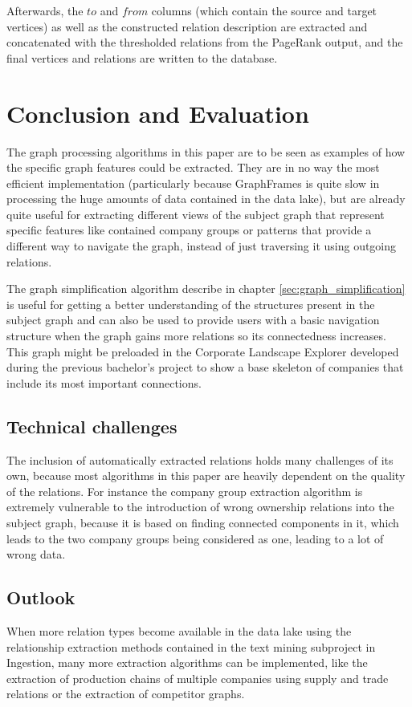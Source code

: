 \documentclass[
        a4paper,     %
        titlepage,   %
        oneside,     %
        parskip      %
]{scrartcl}          %
\begin{document}
  Afterwards, the $to$ and $from$ columns (which contain the source and target vertices)
  as well as the constructed relation description are extracted and concatenated with the thresholded
  relations from the PageRank output, and the final vertices and relations are written
  to the database.

  \section{Conclusion and Evaluation}
  The graph processing algorithms in this paper are to be seen as examples of
  how the specific graph features could be extracted. They are in no way the most
  efficient implementation (particularly because GraphFrames is quite slow in
  processing the huge amounts of data contained in the data lake), but are already
  quite useful for extracting different views of the subject graph that represent
  specific features like contained company groups or patterns that provide a different
  way to navigate the graph, instead of just traversing it using outgoing relations.

  The graph simplification algorithm describe in chapter \ref{sec:graph_simplification}
  is useful for getting a better understanding of the structures present in the subject graph
  and can also be used to provide users with a basic navigation structure when the
  graph gains more relations so its connectedness increases. This graph might
  be preloaded in the Corporate Landscape Explorer developed during the previous
  bachelor's project to show a base skeleton of companies that include its most
  important connections.

  \subsection{Technical challenges}
  The inclusion of automatically extracted relations holds many challenges of its own, because
  most algorithms in this paper are heavily dependent on the quality of the relations.
  For instance the company group extraction algorithm is extremely vulnerable
  to the introduction of wrong ownership relations into the subject graph, because
  it is based on finding connected components in it, which leads to the two company
  groups being considered as one, leading to a lot of wrong data.

  \subsection{Outlook}
  When more relation types become available in the data lake using the relationship extraction methods
  contained in the text mining subproject in Ingestion, many more extraction algorithms
  can be implemented, like the extraction of production chains of multiple companies
  using supply and trade relations or the extraction of competitor graphs.
\end{document}
